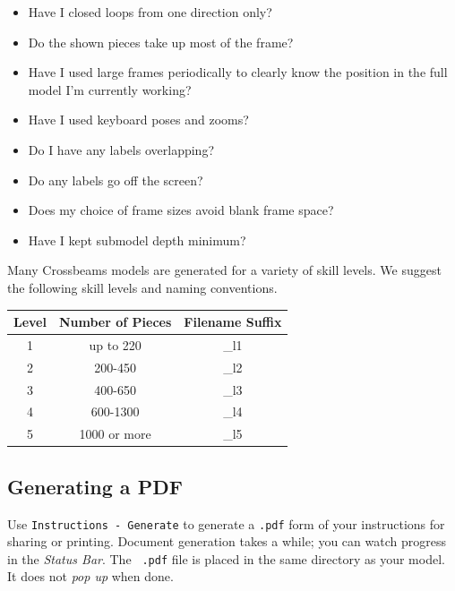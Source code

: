 \documentclass[12pt]{report}
\begin{document}
\begin{itemize}

  \item Have I closed loops from one direction only?

  \item Do the shown pieces take up most of the frame?

  \item Have I used large frames periodically to clearly know the
  position in the full model I'm currently working?

  \item Have I used keyboard poses and zooms?

  \item Do I have any labels overlapping?

  \item Do any labels go off the screen?

  \item Does my choice of frame sizes avoid blank frame space?

  \item Have I kept submodel depth minimum?

\end{itemize}

Many Crossbeams models are generated for a variety of skill levels.
We suggest the following skill levels and naming conventions.

\begin{center}
\begin{tabular}{ccc}
Level & Number of Pieces & Filename Suffix\\
\hline
1 & up to 220 & \_l1\\
2 & 200-450 & \_l2\\
3 & 400-650 & \_l3\\
4 & 600-1300 & \_l4\\
5 & 1000 or more & \_l5\\
\end{tabular}
\end{center}

\subsection{Generating a PDF}

Use {\tt Instructions - Generate} to generate a {\tt .pdf} form of
your instructions for sharing or printing.  Document generation takes
a while; you can watch progress in the \emph{Status Bar}.  The {\tt
  .pdf} file is placed in the same directory as your model.  It does
not \emph{pop up} when done.
\end{document}
